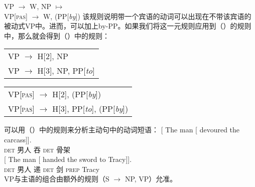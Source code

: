 \ea
VP  $\to$ W, NP $\mapsto$\\
VP[\textsc{pas}]  $\to$ W, (PP[\emph{by}])
\z
该规则说明带一个宾语的动词可以出现在不带该宾语的被动式VP中。进而，可以加上by-PP。如果我们将这一元规则应用到（）的规则中，那么就会得到（）中的规则：
\ea
\begin{tabular}[t]{@{}l@{}}
VP $\to$ H[2], NP\\
VP $\to$ H[3], NP, PP[\emph{to}]\\
\end{tabular}
\z
\ea
\begin{tabular}[t]{@{}l@{}}
VP[\textsc{pas}] $\to$ H[2], (PP[\emph{by}])\\
VP[\textsc{pas}] $\to$ H[3], PP[\emph{to}], (PP[\emph{by}])\\
\end{tabular}
\z
可以用（）中的规则来分析主动句中的动词短语：
\eal
\ex
\gll {} [ The man [ devoured the carcass]].\\
{} {} \textsc{det} 男人 {} 吞 \textsc{det} 骨架\\
\ex
\gll {} [ The man [ handed the sword to Tracy]].\\
{} {} \textsc{det} 男人 {} 递 \textsc{det} 剑 \textsc{prep} Tracy\\
\zl
VP与主语的组合由额外的规则（S $\to$ NP, VP）允准。

